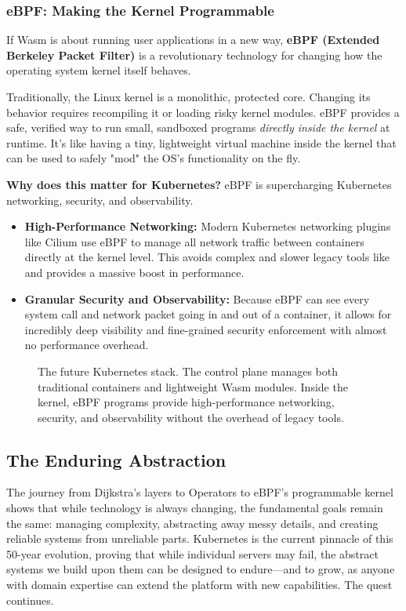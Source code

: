\subsubsection{\textbf{eBPF: Making the Kernel Programmable}}


If Wasm is about running user applications in a new way, \textbf{eBPF (Extended Berkeley Packet Filter)} is a revolutionary technology for changing how the operating system kernel itself behaves.

Traditionally, the Linux kernel is a monolithic, protected core. Changing its behavior requires recompiling it or loading risky kernel modules. eBPF provides a safe, verified way to run small, sandboxed programs \textit{directly inside the kernel} at runtime. It's like having a tiny, lightweight virtual machine inside the kernel that can be used to safely "mod" the OS's functionality on the fly.

\textbf{Why does this matter for Kubernetes?}
eBPF is supercharging Kubernetes networking, security, and observability.
\begin{itemize}
\item \textbf{High-Performance Networking:} Modern Kubernetes networking plugins like Cilium use eBPF to manage all network traffic between containers directly at the kernel level. This avoids complex and slower legacy tools like  and provides a massive boost in performance.
\item \textbf{Granular Security and Observability:} Because eBPF can see every system call and network packet going in and out of a container, it allows for incredibly deep visibility and fine-grained security enforcement with almost no performance overhead.
\end{itemize}
\begin{figure}[htbp]
\centering

\caption{The future Kubernetes stack. The control plane manages both traditional containers and lightweight Wasm modules. Inside the kernel, eBPF programs provide high-performance networking, security, and observability without the overhead of legacy tools.}
\label{fig:C_2}
\end{figure}



\subsection{The Enduring Abstraction}


The journey from Dijkstra's layers to Operators to eBPF's programmable kernel shows that while technology is always changing, the fundamental goals remain the same: managing complexity, abstracting away messy details, and creating reliable systems from unreliable parts. Kubernetes is the current pinnacle of this 50-year evolution, proving that while individual servers may fail, the abstract systems we build upon them can be designed to endure---and to grow, as anyone with domain expertise can extend the platform with new capabilities. The quest continues.
